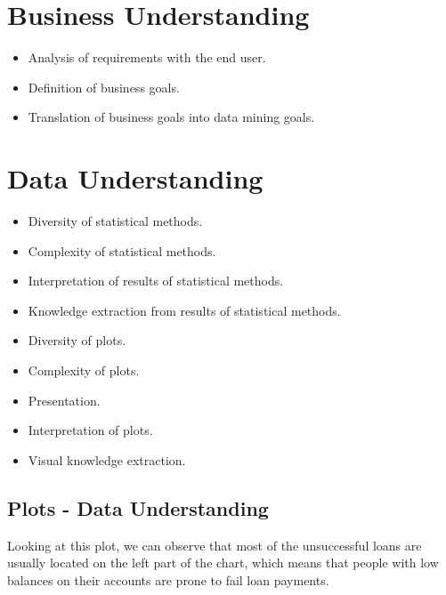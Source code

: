 \documentclass[a4paper,12pt]{report}
\begin{document}
\chapter{Business Understanding}

\begin{itemize}
    \item Analysis of requirements with the end user.
    \item Definition of business goals.
    \item Translation of business goals into data mining goals.
\end{itemize}




\chapter{Data Understanding}

\begin{itemize}
    \item Diversity of statistical methods.
	\item Complexity of statistical methods.
	\item Interpretation of results of statistical methods.
	\item Knowledge extraction from results of statistical methods.
	\item Diversity of plots.
	\item Complexity of plots.
	\item Presentation.
	\item Interpretation of plots.
	\item Visual knowledge extraction.
\end{itemize}

	\section{Plots - Data Understanding}

		Looking at this plot, we can observe that most of the unsuccessful loans are usually located on the left part of the chart, which means that people with low balances on their accounts are prone to fail loan payments.
\end{document}

